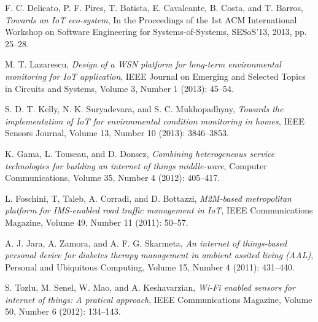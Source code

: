 \documentclass[conference,compsoc]{IEEEtran}
\begin{document}
%
%
%
\begin{thebibliography}{1}
F. C. Delicato, P. F. Pires,  T. Batista, E. Cavalcante, B. Costa, and  T. Barros, \emph{Towards an IoT eco-system}, In the Proceedings of the 1st ACM International Workshop on Software Engineering for Systems-of-Systems, SESoS’13, 2013, pp. 25--28.


M. T. Lazarescu, \emph{Design of a WSN platform for long-term environmental monitoring for IoT application}, IEEE Journal on Emerging and Selected Topics in Circuits and Systems, Volume 3, Number 1 (2013): 45--54.



S. D. T. Kelly, N. K. Suryadevara, and S. C. Mukhopadhyay, \emph{Towards the implementation of IoT for environmental condition monitoring in homes}, IEEE Sensors Journal, Volume 13, Number 10 (2013): 3846--3853.

K. Gama, L. Touseau, and D. Donsez, \emph{Combining heterogeneous service technologies for building an internet of things middle-ware}, Computer Communications, Volume 35, Number 4 (2012): 405--417.


L. Foschini, T, Taleb, A. Corradi, and D. Bottazzi, \emph{M2M-based metropolitan platform for IMS-enabled road traffic management in IoT}, IEEE Communications Magazine, Volume 49, Number 11 (2011): 50--57.


A. J. Jara, A. Zamora, and A. F. G. Skarmeta, \emph{An internet of things-based personal device for diabetes therapy management in ambient assited living (AAL)}, Personal and Ubiquitous Computing, Volume 15, Number 4 (2011): 431--440.




S. Tozlu, M. Senel, W. Mao, and A. Keshavarzian, \emph{Wi-Fi enabled sensors for internet of things: A pratical approach}, IEEE Communications Magazine, Volume 50, Number 6 (2012): 134--143.


\end{thebibliography}
\end{document}

